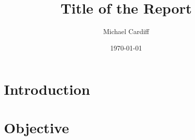\documentclass[letterpaper,12pt]{article}
\begin{document}
\title{Title of the Report}
\author{Michael Cardiff}
\date{\today}
\maketitle

\begin{abstract}
\end{abstract}

\section{Introduction}

\section{Objective}










\end{document}
